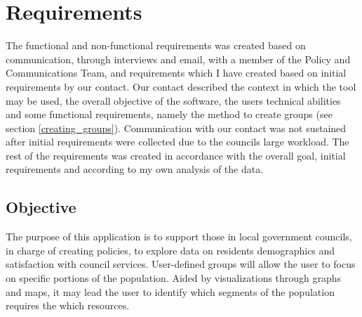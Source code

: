 \chapter{Requirements} \label{ch:requirements}

The functional and non-functional requirements was created based on communication, through interviews and email, with a member of the Policy and Communications Team, and requirements which I have created based on initial requirements by our contact. Our contact described the context in which the tool may be used, the overall objective of the software, the users\textsc{} technical abilities and some functional requirements, namely the method to create groups (see section \ref{creating_groups}). Communication with our contact was not sustained after initial requirements were collected due to the council\textquotesingle s large workload. The rest of the requirements was created in accordance with the overall goal, initial requirements and according to my own analysis of the data.

\section{Objective}
The purpose of this application is to support those in local government councils, in charge of creating policies, to explore data on residents demographics and satisfaction with council services. User-defined groups will allow the user to focus on specific portions of the population. Aided by visualizations through graphs and maps, it may lead the user to identify which segments of the population requires the which resources.

